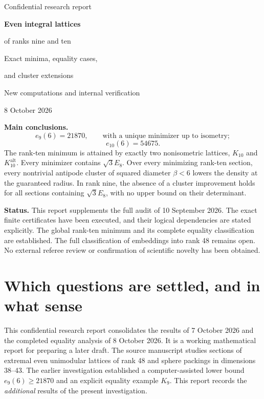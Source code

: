 \documentclass[11pt,a4paper]{article}
\theoremstyle{remark}\newtheorem{remark}[theorem]{Remark}
\newcommand{\Kalt}{K_{10}^{\mathrm{alt}}}
\begin{document}
\begin{titlepage}
\vspace*{18mm}
{\Large\sffamily Confidential research report\par}
\vspace{14mm}
{\huge\bfseries Even integral lattices\par of ranks nine and ten\par}
\vspace{9mm}
{\Large Exact minima, equality cases,\par and cluster extensions\par}
\vspace{12mm}
{\large New computations and internal verification\par 8 October 2026\par}
\vspace{14mm}
\textbf{Main conclusions.}
\[
e_9(6)=21870,\qquad \text{with a unique minimizer up to isometry};
\]
\[
e_{10}(6)=54675.
\]
The rank-ten minimum is attained by exactly two nonisometric lattices, $K_{10}$ and $\Kalt$. Every minimizer contains $\sqrt3E_8$. Over every minimizing rank-ten section, every nontrivial antipode cluster of squared diameter $\beta<6$ lowers the density at the guaranteed radius. In rank nine, the absence of a cluster improvement holds for all sections containing $\sqrt3E_8$, with no upper bound on their determinant.

\vfill
\textbf{Status.} This report supplements the full audit of 10 September 2026. The exact finite certificates have been executed, and their logical dependencies are stated explicitly. The global rank-ten minimum and its complete equality classification are established. The full classification of embeddings into rank 48 remains open. No external referee review or confirmation of scientific novelty has been obtained.
\end{titlepage}
{\small\tableofcontents}
\newpage

\section{Which questions are settled, and in what sense}

This confidential research report consolidates the results of 7 October 2026 and the completed equality analysis of 8 October 2026. It is a working mathematical report for preparing a later draft. The source manuscript studies sections of extremal even unimodular lattices of rank 48 and sphere packings in dimensions 38--43. The earlier investigation established a computer-assisted lower bound $e_9(6)\ge21870$ and an explicit equality example $K_9$. This report records the \emph{additional} results of the present investigation.
\end{document}
